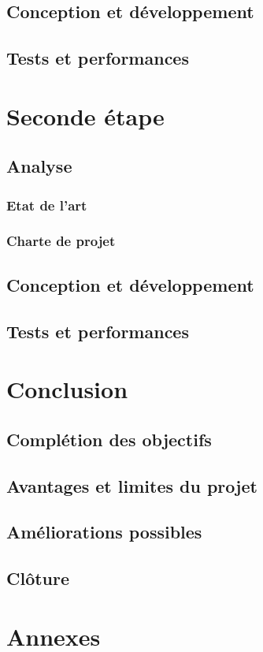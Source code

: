 \documentclass[a4paper, 12pt]{report}
\begin{document}
    \section{Conception et développement}
    \section{Tests et performances}


\chapter{Seconde étape}
\minitoc
{}
\clearpage
    \section{Analyse}
        \subsection{Etat de l'art}
        \subsection{Charte de projet}
    \section{Conception et développement}
    \section{Tests et performances}

\chapter{Conclusion}
\minitoc
{}
\clearpage
    \section{Complétion des objectifs}
    \section{Avantages et limites du projet}
    \section{Améliorations possibles}
    \section{Clôture}

\chapter{Annexes}
\minitoc
{}
\clearpage            

\appendix
\end{document}
